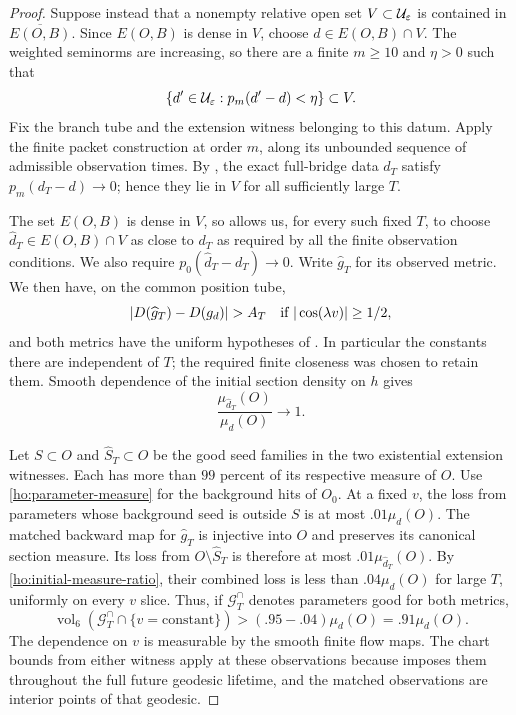 \begin{proof}
Suppose instead that a nonempty relative open set $V\subset\mathcal U_{\varepsilon}$
is contained in $\overline{E(O,B)}$.  Since $E(O,B)$ is dense in $V$,
choose $d\in E(O,B)\cap V$.
The weighted seminorms are increasing, so there are a finite $m\ge10$
and $\eta>0$ such that
\begin{equation}\label{ho:finite-neighborhood}
        \{d'\in\mathcal U_{\varepsilon}:p_m(d'-d)<\eta\}\subset V.
\end{equation}
Fix the branch tube and the extension witness belonging to this datum.
Apply the finite packet construction at order $m$, along its unbounded
sequence of admissible observation times.  By
,
the exact full-bridge data $d_T$ satisfy $p_m(d_T-d)\to0$; hence they
lie in $V$ for all sufficiently large $T$.

The set $E(O,B)$ is dense in $V$, so 
allows us, for every such fixed $T$, to choose
$\widehat d_T\in E(O,B)\cap V$ as close to $d_T$ as required by all the
finite observation conditions.  We also require
$p_0(\widehat d_T-d_T)\to0$.  Write $\widehat g_T$ for its observed
metric.  We then have, on the common position tube,
\begin{equation}\label{ho:persisted-signal}
 |D(\widehat g_T)-D(g_d)|>\amp
                 \quad\text{if }|\cos(\lambda v)|\ge1/2,
\end{equation}
and both metrics have the uniform hypotheses of
.  In particular the constants there are
independent of $T$; the required finite closeness was chosen to retain
them.  Smooth dependence of the initial section density on $h$ gives
\begin{equation}\label{ho:initial-measure-ratio}
                  \frac{\mu_{\widehat d_T}(O)}{\mu_d(O)}\longrightarrow1.
\end{equation}

Let $S\subset O$ and $\widehat S_T\subset O$ be the good seed families
in the two existential extension witnesses.  Each has more than
$99$ percent of its respective measure of $O$.
Use \eqref{ho:parameter-measure} for the background hits of $O_0$.
At a fixed $v$, the loss from parameters whose background seed is
outside $S$ is at most $.01\mu_d(O)$.
The matched backward map for $\widehat g_T$ is injective into $O$ and
preserves its canonical section measure.  Its loss from
$O\setminus\widehat S_T$ is therefore at most
$.01\mu_{\widehat d_T}(O)$.
By \eqref{ho:initial-measure-ratio}, their combined loss is less than
$.04\mu_d(O)$ for large $T$, uniformly on every $v$ slice.  Thus, if
$\mathcal G_T^{\cap}$ denotes parameters good for both metrics,
\begin{equation}\label{ho:joint-good-slice}
 \operatorname{vol}_6(\mathcal G_T^{\cap}\cap\{v=\text{constant}\})
       >(.95-.04)\mu_d(O)=.91\mu_d(O).
\end{equation}
The dependence on $v$ is measurable by the smooth finite flow maps.
The chart bounds from either witness apply at these observations
because  imposes them throughout the full future
geodesic lifetime, and the matched observations are interior points
of that geodesic.


\end{proof}
